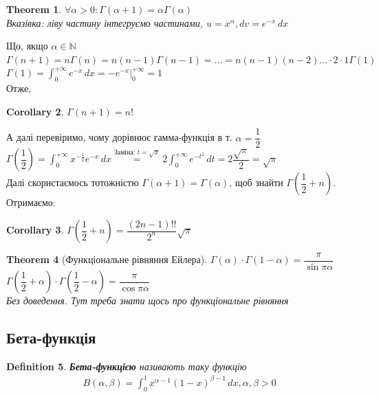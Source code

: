 \documentclass[a4paper, 10pt]{article}
\def\huge{\displaystyle}
\theoremstyle{theoremdd}
\newtheorem{theorem}{Theorem}[subsection]
\theoremstyle{theoremdd}
\newtheorem{definition}[theorem]{Definition}
\theoremstyle{theoremdd}
\theoremstyle{theoremdd}
\theoremstyle{theoremdd}
\theoremstyle{theoremdd}
\theoremstyle{theoremdd}
\theoremstyle{theoremdd}
\newtheorem{corollary}[theorem]{Corollary}
\begin{document}
\begin{theorem}
$\forall \alpha > 0: \Gamma (\alpha+1) = \alpha \Gamma (\alpha)$\\
\textit{Вказівка: ліву частину інтегруємо частинами}, $u = x^{\alpha}, dv = e^{-x}\,dx$
\end{theorem}
Що, якщо $\alpha \in \mathbb{N}$\\
$\Gamma(n+1) = n \Gamma (n) = n(n-1) \Gamma (n-1) = \dots = n(n-1)(n-2)\dots \cdot 2 \cdot 1 \Gamma (1)$\\
$\Gamma(1) = \huge \int_0^{+\infty} e^{-x}\,dx = -e^{-x} \Big|_{0}^{+\infty} = 1$\\
Отже,
\begin{corollary}
$\Gamma(n+1) = n!$
\end{corollary}
А далі перевіримо, чому дорівнює гамма-функція в т. $\alpha = \dfrac{1}{2}$\\
$\Gamma \left( \dfrac{1}{2} \right) = \huge \int_0^{+\infty} x^{-\frac{1}{2}}e^{-x}\,dx \overset{\textrm{Заміна: } t = \sqrt{x}}{=} 2 \huge \int_0^{+\infty} e^{-t^2}\,dt = 2 \dfrac{\sqrt{\pi}}{2} = \sqrt{\pi}$\\
Далі скористаємось тотожністю $\Gamma(\alpha+1) = \Gamma(\alpha)$, щоб знайти $\Gamma \left( \dfrac{1}{2} + n \right)$. Отримаємо:
\begin{corollary}
$\Gamma \left( \dfrac{1}{2} + n \right) = \dfrac{(2n-1)!!}{2^n} \sqrt{\pi}$
\end{corollary}

\begin{theorem}[Функціональне рівняння Ейлера]
$\Gamma(\alpha) \cdot \Gamma(1-\alpha) = \dfrac{\pi}{\sin \pi \alpha}$\\
$\Gamma \left(\dfrac{1}{2} + \alpha \right) \cdot \Gamma \left(\dfrac{1}{2}-\alpha \right) = \dfrac{\pi}{\cos \pi \alpha}$\\
\textit{Без доведення. Тут треба знати щось про функціональне рівняння}
\end{theorem}

\subsection{Бета-функція}
\begin{definition}
\textbf{Бета-функцією} називають таку функцію
\begin{align*}
B(\alpha,\beta) = \int_0^1 x^{\alpha-1} (1-x)^{\beta-1}\,dx, \alpha,\beta>0
\end{align*}
\end{definition}
\end{document}
